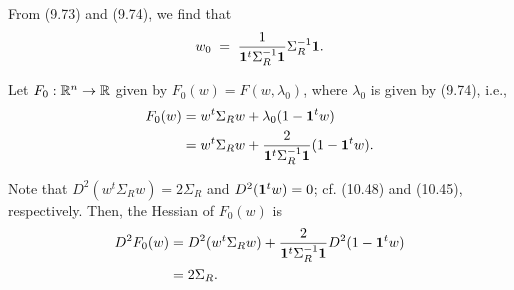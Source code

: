 From (9.73) and (9.74), we find that
\begin{equation}
w_0 \;=\; \frac{1}{\mathbf{1}^t\Sigma_R^{-1}\mathbf{1}}\Sigma_R^{-1}\mathbf{1}.
\end{equation}

Let $F_0:\mathbb{R}^n\to\mathbb{R}$ given by $F_0(w)=F(w,\lambda_0)$, where $\lambda_0$ is given by
(9.74), i.e.,
\begin{align*}
F_0(w) &= w^t\Sigma_Rw+\lambda_0(1-\mathbf{1}^tw) \\
&= w^t\Sigma_Rw+\frac{2}{\mathbf{1}^t\Sigma_R^{-1}\mathbf{1}}(1-\mathbf{1}^tw).
\end{align*}

Note that $D^2(w^t\Sigma_Rw)=2\Sigma_R$ and $D^2(\mathbf{1}^tw)=0$; cf. (10.48) and
(10.45), respectively. Then, the Hessian of $F_0(w)$ is
\begin{align*}
D^2F_0(w) &= D^2(w^t\Sigma_Rw)+\frac{2}{\mathbf{1}^t\Sigma_R^{-1}\mathbf{1}}
D^2(1-\mathbf{1}^tw) \\
&= 2\Sigma_R.
\end{align*}
